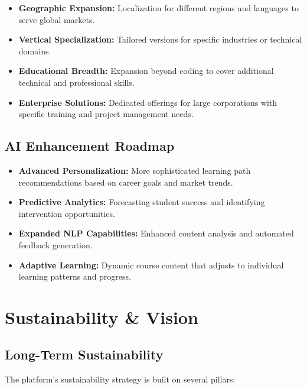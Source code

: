 \documentclass[12pt,a4paper]{report}
\begin{document}
\begin{itemize}
    \item \textbf{Geographic Expansion:} Localization for different regions and languages to serve global markets.

    \item \textbf{Vertical Specialization:} Tailored versions for specific industries or technical domains.

    \item \textbf{Educational Breadth:} Expansion beyond coding to cover additional technical and professional skills.

    \item \textbf{Enterprise Solutions:} Dedicated offerings for large corporations with specific training and project management needs.
\end{itemize}

\subsection{AI Enhancement Roadmap}

\begin{itemize}
    \item \textbf{Advanced Personalization:} More sophisticated learning path recommendations based on career goals and market trends.

    \item \textbf{Predictive Analytics:} Forecasting student success and identifying intervention opportunities.

    \item \textbf{Expanded NLP Capabilities:} Enhanced content analysis and automated feedback generation.

    \item \textbf{Adaptive Learning:} Dynamic course content that adjusts to individual learning patterns and progress.
\end{itemize}

\section{Sustainability \& Vision}

\subsection{Long-Term Sustainability}

The platform's sustainability strategy is built on several pillars:
\end{document}

